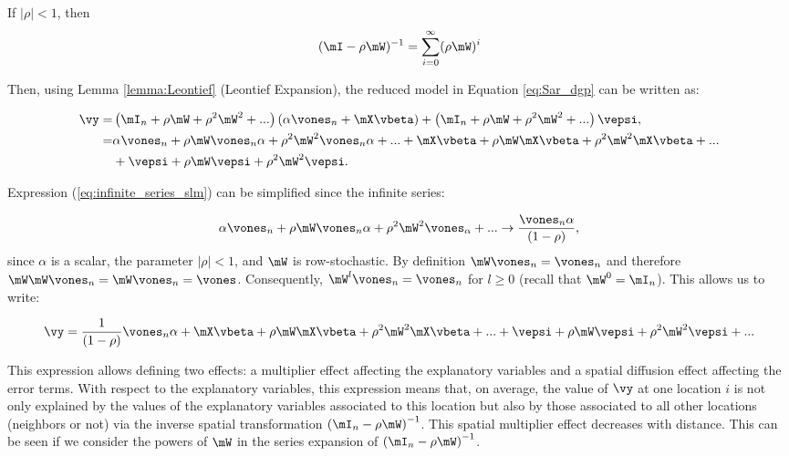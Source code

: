 \documentclass[english,12pt]{book}\usepackage[]{graphicx}\usepackage[]{xcolor}
\begin{document}
\begin{lemma}\label{lemma:Leontief}
If $\left|\rho\right|  < 1$, then
	\begin{equation*}
	(\mI - \rho \mW)^{-1} = \sum_{i = 0} ^{\infty}(\rho \mW)^{i}
	\end{equation*}
\end{lemma}

Then, using Lemma \ref{lemma:Leontief} (Leontief Expansion), the reduced model in Equation \eqref{eq:Sar_dgp} can be written as:

\begin{equation}\label{eq:infinite_series_slm}
  \begin{aligned}
      \vy  = &\left(\mI_n + \rho\mW + \rho^2\mW^2 + ...\right)\left(\alpha \vones_n + \mX\vbeta\right) + \left(\mI_n + \rho\mW + \rho^2\mW^2 + ...\right)\vepsi, \\
           = & \alpha\vones_n + \rho\mW\vones_n\alpha + \rho^2\mW^2\vones_n\alpha + ... + \mX\vbeta + \rho\mW\mX\vbeta + \rho^2\mW^2\mX\vbeta + ... \\
          & + \vepsi + \rho\mW\vepsi + \rho^2\mW^2\vepsi.
  \end{aligned}
\end{equation}

Expression (\ref{eq:infinite_series_slm}) can be simplified since the infinite series:

\begin{equation*}
\alpha\vones_n + \rho\mW\vones_n\alpha + \rho^2\mW^2\vones_\alpha + ... \to \frac{\vones_n\alpha}{\left(1 - \rho\right)},
\end{equation*}
%
since $\alpha$ is a scalar, the parameter $\left|\rho\right|  < 1$, and $\mW$ is row-stochastic. By definition $\mW\vones_n = \vones_n$ and therefore $\mW\mW\vones_n = \mW\vones_n = \vones$. Consequently, $\mW^l\vones_n = \vones_n$ for $l\geq 0$ (recall that $\mW^0 = \mI_n$). This allows us to write:

\begin{equation*}
\vy = \frac{1}{(1-\rho)}\vones_n\alpha + \mX\vbeta + \rho\mW\mX\vbeta + \rho^2\mW^2\mX\vbeta + ... + \vepsi + \rho\mW\vepsi + \rho^2\mW^2\vepsi + ...
\end{equation*}

This expression allows defining two effects: a multiplier effect affecting the explanatory variables and a spatial diffusion effect affecting the error terms. With respect to the explanatory variables, this expression means that, on average, the value of $\vy$ at one location $i$ is not only explained by the values of the explanatory variables associated to this location but also by those associated to all other locations (neighbors or not) via the inverse spatial transformation $\left(\mI_n - \rho \mW\right)^{-1}$. This spatial multiplier effect decreases with distance. This can be seen if we consider the powers of $\mW$ in the series expansion of $\left(\mI_n - \rho \mW\right)^{-1}$. 
\end{document}
